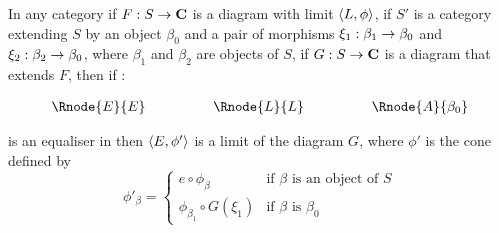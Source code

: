 \documentclass[10pt,a4paper]{scrartcl}
\begin{document}
\begin{lemma}
In any category  if $F: S \rightarrow \textbf{C}$ is a diagram with limit $\langle L,\phi\rangle$,
if $S'$ is a category extending $S$ by an object $\beta_0$ and a pair of morphisms $\xi_1: \beta_1 \rightarrow \beta_0$ and $\xi_2: \beta_2 \rightarrow \beta_0$, where $\beta_1$ and $\beta_2$ are objects of $S$, if $G: S \rightarrow \textbf{C}$ is a diagram that extends $F$, then if :
\begin{center}
\begin{equation}
\label{equaliser}
\begin{array}{cp{1cm}cp{1cm} c}
\Rnode{E}{E}& &    \Rnode{L}{L}  & & \Rnode{A}{\beta_0} 
\end{array}
\end{equation}
\setlength{\arroffsetA}{3pt}
\setlength{\arroffsetB}{3pt}
\setlength{\arroffsetA}{-3pt}
\setlength{\arroffsetB}{-3pt}
\arreset
\end{center}
is an equaliser in  then $\langle E,\phi'\rangle$ is a limit of the diagram $G$, where
$\phi'$ is the cone defined by
\begin{equation*}
\phi'_\beta =
\left\{
	\begin{array}{ll}
		e \circ \phi_\beta           & \mbox{if } \beta \mbox{ is an object of } S  \\
		\phi_{\beta_1} \circ G(\xi_1) & \mbox{if } \beta \mbox{ is } \beta_0 
	\end{array}
\right.
\end{equation*}

\end{lemma}
\end{document}
